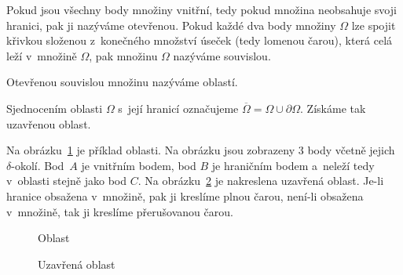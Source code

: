 Pokud jsou všechny body množiny vnitřní, tedy pokud množina neobsahuje svoji hranici, pak ji nazýváme otevřenou. Pokud každé dva body množiny \(\Omega\) lze spojit křivkou složenou z~konečného množství úseček (tedy lomenou čarou), která celá leží v~množině \(\Omega\), pak množinu \(\Omega\) nazýváme souvislou.  

\begin{fact}
Otevřenou souvislou množinu nazýváme oblastí.
\end{fact}

\begin{fact}
Sjednocením oblasti \(\Omega\) s~její hranicí označujeme \(\overline{\Omega} = \Omega \cup \partial \Omega\). Získáme tak uzavřenou oblast. 
\end{fact}

Na obrázku~\ref{img:oblast} je příklad oblasti. Na obrázku jsou zobrazeny 3 body včetně jejich \(\delta\)-okolí. Bod~\(A\) je vnitřním bodem, bod \(B\) je hraničním bodem a~neleží tedy v~oblasti stejně jako bod \(C\). Na obrázku~\ref{img:uzavrena_oblast} je nakreslena uzavřená oblast. Je-li hranice obsažena v~množině, pak ji kreslíme plnou čarou, není-li obsažena v~množině, tak ji kreslíme přerušovanou čarou.

\begin{figure}
\begin{center}
\caption{Oblast}
\end{center}
\label{img:oblast}
\end{figure}

\begin{figure}
\begin{center}
\caption{Uzavřená oblast}
\end{center}
\label{img:uzavrena_oblast}
\end{figure}

